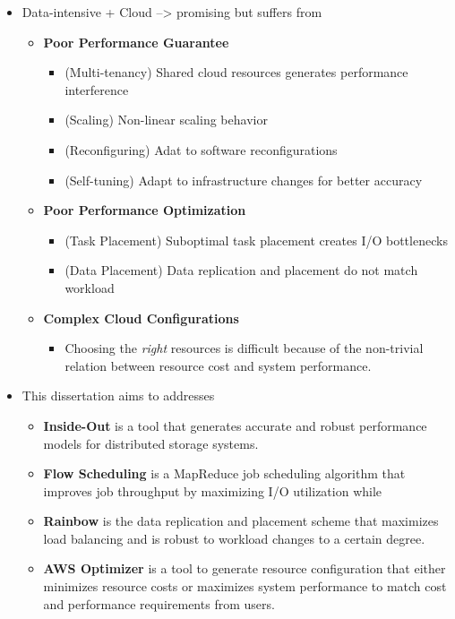 \iffalse
\begin{itemize}

\item Data-intensive + Cloud --> promising but suffers from
  \begin{itemize}
  \item \textbf{Poor Performance Guarantee}
  	\begin{itemize}
  	\item (Multi-tenancy) Shared cloud resources generates performance interference
  	\item (Scaling) Non-linear scaling behavior
  	\item (Reconfiguring) Adat to software reconfigurations
  	\item (Self-tuning) Adapt to infrastructure changes for better accuracy 
  	\end{itemize}

  \item \textbf{Poor Performance Optimization}
  	\begin{itemize}
  	\item (Task Placement) Suboptimal task placement creates I/O bottlenecks
  	\item (Data Placement) Data replication and placement do not match workload
    \end{itemize}
  
  \item \textbf{Complex Cloud Configurations} 
    \begin{itemize}
    \item Choosing the \textit{right} resources is difficult because of
    the non-trivial relation between resource cost and system performance.
    \end{itemize}
  \end{itemize}

\item This dissertation aims to addresses
  \begin{itemize}
  \item \textbf{Inside-Out} is a tool that generates
  accurate and robust performance models for distributed storage systems.
  \item \textbf{Flow Scheduling} is a MapReduce job scheduling algorithm
  that improves job throughput by maximizing I/O utilization while 
  \item \textbf{Rainbow} is the data replication and placement scheme that
  maximizes load balancing and is robust to
  workload changes to a certain degree.
  \item \textbf{AWS Optimizer} is a tool to generate resource configuration that
  either minimizes resource costs or maximizes system performance to
  match cost and performance requirements from users.
  \end{itemize}

\end{itemize} 


